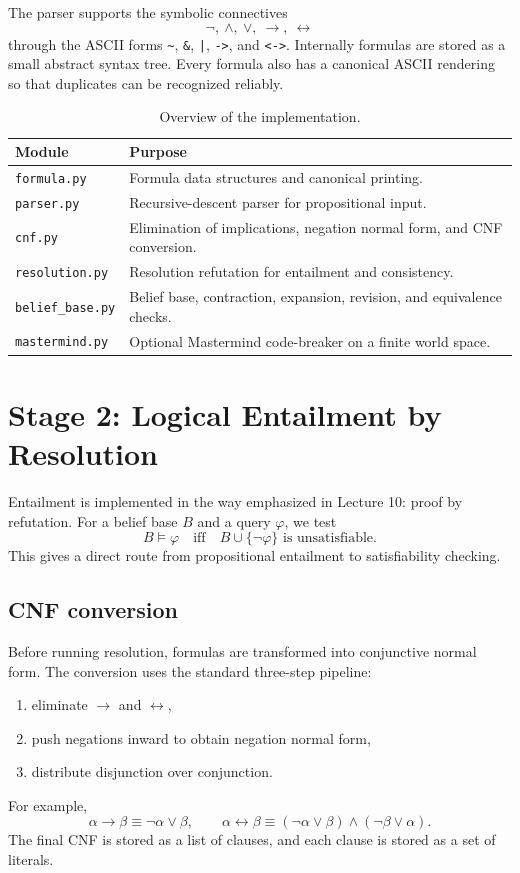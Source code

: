\documentclass[11pt,a4paper]{article}
\begin{document}
The parser supports the symbolic connectives
\[
\neg,\ \wedge,\ \vee,\ \rightarrow,\ \leftrightarrow
\]
through the ASCII forms \verb|~|, \verb|&|, \verb+|+, \verb|->|, and \verb|<->|. Internally formulas are stored as a small abstract syntax tree. Every formula also has a canonical ASCII rendering so that duplicates can be recognized reliably.

\begin{table}[h]
\centering
\small
\begin{tabular}{>{\raggedright\arraybackslash}p{3.1cm} p{8.9cm}}
\toprule
\textbf{Module} & \textbf{Purpose} \\
\midrule
\texttt{formula.py} & Formula data structures and canonical printing. \\
\texttt{parser.py} & Recursive-descent parser for propositional input. \\
\texttt{cnf.py} & Elimination of implications, negation normal form, and CNF conversion. \\
\texttt{resolution.py} & Resolution refutation for entailment and consistency. \\
\texttt{belief\_base.py} & Belief base, contraction, expansion, revision, and equivalence checks. \\
\texttt{mastermind.py} & Optional Mastermind code-breaker on a finite world space. \\
\bottomrule
\end{tabular}
\caption{Overview of the implementation.}
\end{table}

\section{Stage 2: Logical Entailment by Resolution}
Entailment is implemented in the way emphasized in Lecture 10: proof by refutation. For a belief base \(B\) and a query \(\varphi\), we test
\[
B \models \varphi \quad \text{iff} \quad B \cup \{\neg \varphi\}
\text{ is unsatisfiable.}
\]
This gives a direct route from propositional entailment to satisfiability checking.

\subsection*{CNF conversion}
Before running resolution, formulas are transformed into conjunctive normal form. The conversion uses the standard three-step pipeline:
\begin{enumerate}
    \item eliminate \(\rightarrow\) and \(\leftrightarrow\),
    \item push negations inward to obtain negation normal form,
    \item distribute disjunction over conjunction.
\end{enumerate}
For example,
\[
\alpha \rightarrow \beta \equiv \neg \alpha \vee \beta,
\qquad
\alpha \leftrightarrow \beta \equiv (\neg \alpha \vee \beta) \wedge (\neg \beta \vee \alpha).
\]
The final CNF is stored as a list of clauses, and each clause is stored as a set of literals.
\end{document}

